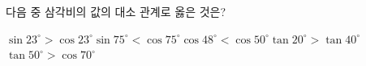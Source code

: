 다음 중 삼각비의 값의 대소 관계로 옳은 것은?
\begin{choicesii}{$\sin 23^\circ>\cos 23^\circ$}{$\sin 75^\circ<\cos 75^\circ$}{$\cos 48^\circ<\cos 50^\circ$}{$\tan 20^\circ>\tan 40^\circ$}{$\tan 50^\circ>\cos 70^\circ$}\end{choicesii}
